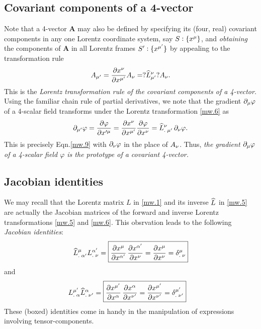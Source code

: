 \subsection{Covariant components of a 
4-vector} Note 
that a 4-vector $\mathbf{A}$ may also be defined by 
specifying its (four, real) covariant components in any 
one Lorentz coordinate system, say $S:\{x^{{\mu}}\}$, and 
\textit{obtaining} the components of $\mathbf{A}$ in 
all Lorentz frames $S':\{x^{{\mu'}}\}$ by appealing to  
the transformation rule
\begin{align}\label{mw.10}
A_{{\mu'}}=\frac{{\partial} x^{{\nu}}}{{\partial} 
x^{{\mu'}}}A_{{\nu}}=?{{\widehat{L}}}^{{\nu}}_{{\mu'}}?A_{{\nu}}.
\end{align}
This  is the \textsl{Lorentz transformation rule of the  
covariant components of a 4-vector}.  Using the familiar 
chain rule of partial derivatives, we note that the gradient 
${\partial}_{{\mu}}\varphi$ of a 4-scalar field transforms under the 
Lorentz transformation \eqref{mw.6} as
\begin{align}\label{mw.11}
{\ensuremath{\partial}}_{{\mu'}}\varphi
=\frac{{\partial} \varphi}{{\partial} x'^{{\mu}}}
=\frac{{\partial} x^{{\nu}}}{{\partial} x^{{\mu'}}}\frac{{\partial} 
\varphi}{{\partial} x^{{\nu}}} 
={{{\widehat{L}}}^{{\nu}}_{.\;{\mu'}}}\,{\partial}_{{\nu}}\varphi.
\end{align}
This is precisely Eqn.\eqref{mw.9} with ${\partial}_{{\nu}}\varphi$ 
in the place of $A_{{\nu}}$. Thus, \textsl{the gradient 
${\partial}_{{\mu}}\varphi $ of a 4-scalar field $\varphi$ 
is the prototype of a covariant 4-vector.}

\subsection{Jacobian identities}

We may recall that the Lorentz matrix $L$ in 
\eqref{mw.1} and its inverse ${\widehat{L}}$ in \eqref{mw.5} 
are actually the Jacobian matrices of the forward and 
inverse Lorentz transformations \eqref{mw.5} and 
\eqref{mw.6}. This obsrvation leads to the following 
\textsl{Jacobian identities}:
\begin{align}\label{mw.12}
{\ensuremath{{{\widehat{L}}}^{{\mu}}_{.\;{\alpha}'}}}{\ensuremath{{L }^{{\alpha}'}_{.\;{\nu}}}}
=\boxed{\frac{{\partial} x^{{\mu}}}{{\partial} x^{{\alpha}'}}\,\frac{{\partial} 
x^{{\alpha}'}}{{\partial} x^{{\nu}}}=\frac{{\partial} x^{{\mu}}}{{\partial} 
x^{{\nu}}}={{\delta}^{{\mu}}_{.\;{\nu}}}}
\end{align}
and
\begin{align}\label{mw.13}
&{{L}^{{\mu'}}_{.\;{\alpha}}}{{{\widehat{L}}}^{{\alpha}}_{.\;{\nu'}}}
=\boxed{\frac{{\partial} x^{{\mu'}}}{{\partial} x^{{\alpha}}}\,\frac{{\partial} 
x^{{\alpha}}}{{\partial} x^{{\nu'}}}=\frac{ {\partial} x^{{\mu'}}}{{\partial} 
x^{{\nu'}}}={{\delta}^{{\mu'}}_{.\;{\nu'}}}}
\end{align}
These  (boxed) identities come in handy in  the 
manipulation of expressions involving  
tensor-components.


